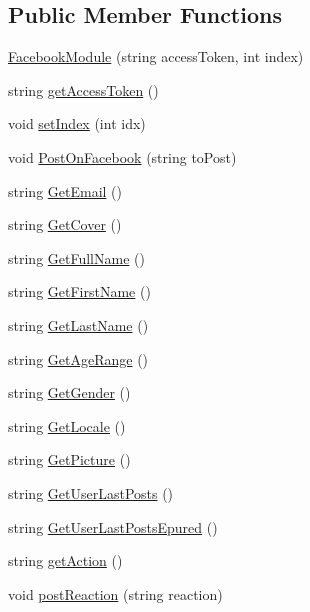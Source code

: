 \subsection*{Public Member Functions}
\begin{DoxyCompactItemize}
\item 
\mbox{\hyperlink{classArea_1_1Models_1_1FacebookModule_ae316294726eb340c34653d405b244682}{Facebook\+Module}} (string access\+Token, int index)
\item 
string \mbox{\hyperlink{classArea_1_1Models_1_1FacebookModule_a2945ca6108f012ea53ea172e97bcd267}{get\+Access\+Token}} ()
\item 
void \mbox{\hyperlink{classArea_1_1Models_1_1FacebookModule_ace52541633256d5401d817e8e83a8753}{set\+Index}} (int idx)
\item 
void \mbox{\hyperlink{classArea_1_1Models_1_1FacebookModule_a374b7b02158cb5b6a128d309fe355638}{Post\+On\+Facebook}} (string to\+Post)
\item 
string \mbox{\hyperlink{classArea_1_1Models_1_1FacebookModule_a5f6a9c9d1fbbb460c4dce234cda99e5e}{Get\+Email}} ()
\item 
string \mbox{\hyperlink{classArea_1_1Models_1_1FacebookModule_a1e30037d6e0356e4600b944125f4fbe7}{Get\+Cover}} ()
\item 
string \mbox{\hyperlink{classArea_1_1Models_1_1FacebookModule_af68384d31672703c55507bf26cbb22bf}{Get\+Full\+Name}} ()
\item 
string \mbox{\hyperlink{classArea_1_1Models_1_1FacebookModule_a3684449e4150b927a132f20c52e7b568}{Get\+First\+Name}} ()
\item 
string \mbox{\hyperlink{classArea_1_1Models_1_1FacebookModule_a6a914f79bdec507a46726e8633f9e8c1}{Get\+Last\+Name}} ()
\item 
string \mbox{\hyperlink{classArea_1_1Models_1_1FacebookModule_aa43092f0d311e77e152eb60963d90de5}{Get\+Age\+Range}} ()
\item 
string \mbox{\hyperlink{classArea_1_1Models_1_1FacebookModule_ae92704bd810ff0c1aadba2e970292280}{Get\+Gender}} ()
\item 
string \mbox{\hyperlink{classArea_1_1Models_1_1FacebookModule_ab9a21a8a45ed5426a2a92e2fcdb440f4}{Get\+Locale}} ()
\item 
string \mbox{\hyperlink{classArea_1_1Models_1_1FacebookModule_a8aaaadbcc1671809ce22415b38dd2d50}{Get\+Picture}} ()
\item 
string \mbox{\hyperlink{classArea_1_1Models_1_1FacebookModule_a83085dabb1a020b586486e67f9814b76}{Get\+User\+Last\+Posts}} ()
\item 
string \mbox{\hyperlink{classArea_1_1Models_1_1FacebookModule_a86f4f25674d0aef1fc39293f40960c29}{Get\+User\+Last\+Posts\+Epured}} ()
\item 
string \mbox{\hyperlink{classArea_1_1Models_1_1FacebookModule_aeb88d4de280aa76fa80c92509b7df265}{get\+Action}} ()
\item 
void \mbox{\hyperlink{classArea_1_1Models_1_1FacebookModule_aa992d24aaa0e9ebd0a2f2c38607222d5}{post\+Reaction}} (string reaction)
\end{DoxyCompactItemize}
